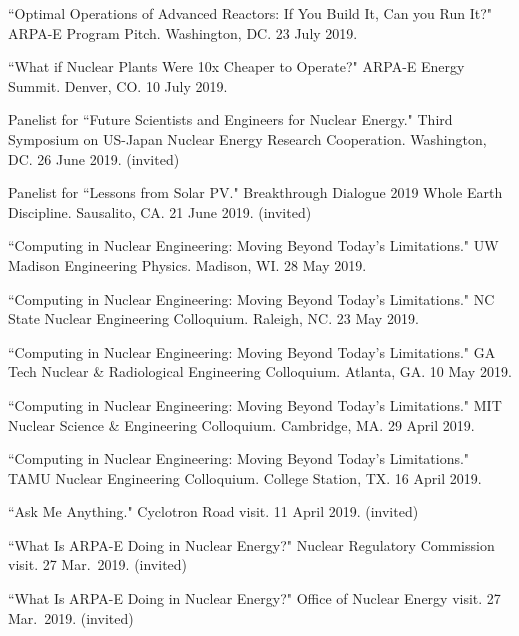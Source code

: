 \begin{bibsection}
\item ``Optimal Operations of Advanced Reactors: If You Build
It, Can you Run It?" ARPA-E Program Pitch. Washington, DC. 23 July 2019. 

\item ``What if Nuclear Plants Were 10x Cheaper to Operate?"
ARPA-E Energy Summit. Denver, CO. 10 July 2019. 

\item Panelist for ``Future Scientists and Engineers for Nuclear Energy." Third Symposium on US-Japan Nuclear Energy Research Cooperation. Washington, DC. 26 June 2019. (invited)

\item Panelist for ``Lessons from Solar PV." Breakthrough Dialogue 2019 Whole Earth Discipline. Sausalito, CA. 21 June 2019. (invited)

\item ``Computing in Nuclear Engineering: Moving Beyond Today's Limitations." UW Madison Engineering Physics. Madison, WI. 28 May 2019.

\item ``Computing in Nuclear Engineering: Moving Beyond Today's Limitations." NC State Nuclear Engineering Colloquium. Raleigh, NC. 23 May 2019.


\item ``Computing in Nuclear Engineering: Moving Beyond Today's Limitations." GA Tech Nuclear \& Radiological Engineering Colloquium. Atlanta, GA. 10 May 2019.

\item ``Computing in Nuclear Engineering: Moving Beyond Today's Limitations." MIT Nuclear Science \& Engineering Colloquium. Cambridge, MA. 29 April 2019.

\item ``Computing in Nuclear Engineering: Moving Beyond Today's Limitations." TAMU Nuclear Engineering Colloquium. College Station, TX. 16 April 2019.

\item ``Ask Me Anything." Cyclotron Road visit. 11 April 2019. (invited)

\item ``What Is ARPA-E Doing in Nuclear Energy?" Nuclear Regulatory Commission visit. 27 Mar.\ 2019. (invited)

\item ``What Is ARPA-E Doing in Nuclear Energy?" Office of Nuclear Energy visit. 27 Mar.\ 2019. (invited)


\end{bibsection}
